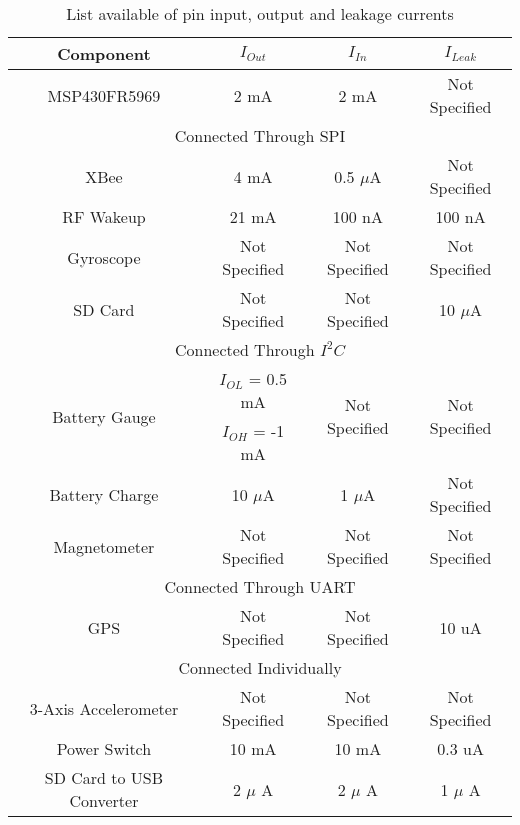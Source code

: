 \begin{table}[H]
  \centering
  \caption{List available of pin input, output and leakage currents}
    \begin{tabular}{|c|c|c|c|}
    \hline
    \rowcolor{Gray}
    Component & $I_{Out}$  & $I_{In}$   & $I_{Leak}$ \\
    \hline\hline
    MSP430FR5969 & 2 mA  & 2 mA  & Not Specified \\ \hline


    \multicolumn{4}{|c|}{\cellcolor{Gray}Connected Through SPI} \\ \hline
    XBee  & 4 mA  & 0.5 $\mu$A & Not Specified \\ \hline
    RF Wakeup & 21 mA  & 100 nA & 100 nA \\ \hline
    Gyroscope & Not Specified & Not Specified & Not Specified \\ \hline
    SD Card & Not Specified & Not Specified & 10 $\mu$A \\ \hline

    \multicolumn{4}{|c|}{\cellcolor{Gray}Connected Through $I^2C$} \\ \hline
    \multirow{2}{*}{Battery Gauge} & $I_{OL}$ = 0.5 mA & \multirow{2}{*}{Not Specified} & \multirow{2}{*}{Not Specified} \\
    & $I_{OH}$ = -1 mA & &\\ \hline
    Battery Charge & 10 $\mu$A  & 1 $\mu$A  & Not Specified \\ \hline
    Magnetometer & Not Specified & Not Specified & Not Specified \\ \hline
  
  	
    \multicolumn{4}{|c|}{\cellcolor{Gray}Connected Through UART} \\ \hline

    GPS   & Not Specified & Not Specified & 10 uA \\ \hline
   

    \multicolumn{4}{|c|}{\cellcolor{Gray}Connected Individually} \\ \hline
    3-Axis Accelerometer & Not Specified & Not Specified & Not Specified \\ \hline
    Power Switch & 10 mA & 10 mA & 0.3 uA \\ \hline
 	SD Card to USB Converter &  2 $\mu$ A     &    2 $\mu$ A      &  1 $\mu$ A   \\
    \hline
    \end{tabular}%
  \label{tab:drivingCap}
\end{table}%


